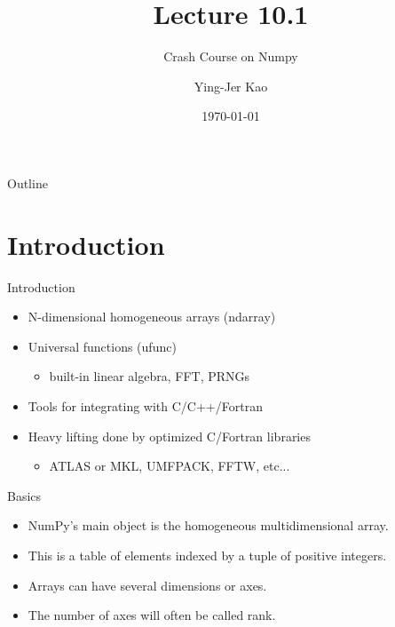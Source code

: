 \documentclass{beamer}
\title[Crash Course on Numpy ] %
{Lecture 10.1}
\subtitle
{Crash Course on Numpy} %
\author[Ying-Jer Kao] %
{Ying-Jer Kao}
\institute[National Taiwan University] %
{
  Department of Physics\\
 National Taiwan University
  }
\date[Numerical Analysis and Programming] %
{\today}
\begin{document}
\begin{frame}
  \titlepage
\end{frame}

\begin{frame}{Outline}
  \tableofcontents
\end{frame}



\section[Introduction]{Introduction}
\begin{frame}{Introduction}
\begin{itemize}
\item N-dimensional homogeneous arrays (ndarray) 
\item Universal functions (ufunc)
\begin{itemize}
\item built-in linear algebra, FFT, PRNGs 
\end{itemize}
\item Tools for integrating with C/C++/Fortran 
\item Heavy lifting done by optimized C/Fortran libraries
\begin{itemize}
\item ATLAS or MKL, UMFPACK, FFTW, etc...
\end{itemize} 
\end{itemize}
\end{frame}

\begin{frame}{Basics}
\begin{itemize}
\item NumPy's main object is the \alert{homogeneous multidimensional array}. 
\item This is a table of elements indexed by a tuple of positive integers.
\item  Arrays can have several dimensions or \alert{axes}. 
\item The number of axes will often be called \alert{rank}.
\end{itemize}
\end{frame}
\end{document}
